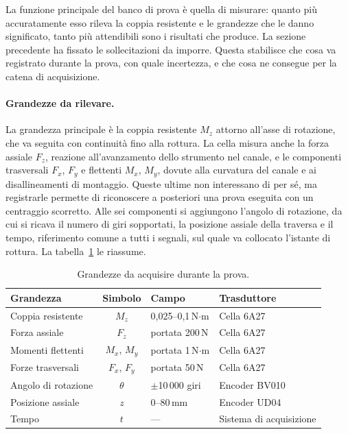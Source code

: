 La funzione principale del banco di prova è quella di misurare: quanto più
accuratamente esso rileva la coppia resistente e le grandezze che le danno
significato, tanto più attendibili sono i risultati che produce. La sezione
precedente ha fissato le sollecitazioni da imporre. Questa stabilisce che cosa va
registrato durante la prova, con quale incertezza, e che cosa ne consegue per la
catena di acquisizione.

\paragraph{Grandezze da rilevare.}
La grandezza principale è la coppia resistente $M_z$ attorno all'asse di
rotazione, che va seguita con continuità fino alla rottura. La cella misura anche
la forza assiale $F_z$, reazione all'avanzamento dello strumento nel canale, e le
componenti trasversali $F_x$, $F_y$ e flettenti $M_x$, $M_y$, dovute alla
curvatura del canale e ai disallineamenti di montaggio. Queste ultime non
interessano di per sé, ma registrarle permette di riconoscere a posteriori una
prova eseguita con un centraggio scorretto. Alle sei componenti si aggiungono
l'angolo di rotazione, da cui si ricava il numero di giri sopportati, la
posizione assiale della traversa e il tempo, riferimento comune a tutti i
segnali, sul quale va collocato l'istante di rottura. La
tabella~\ref{tab:grandezze} le riassume.

\begin{table}[!tb]
    \centering
    \caption{Grandezze da acquisire durante la prova.}
    \label{tab:grandezze}
    \footnotesize
    \setlength{\tabcolsep}{4pt}
    \begin{tabularx}{\linewidth}{@{}>{\raggedright\arraybackslash}X c l l@{}}
        \toprule
        Grandezza & Simbolo & Campo & Trasduttore \\
        \midrule
        Coppia resistente        & $M_z$          & 0,025--0,1\,N$\cdot$m & Cella 6A27 \\
        Forza assiale            & $F_z$          & portata 200\,N        & Cella 6A27 \\
        Momenti flettenti        & $M_x$, $M_y$   & portata 1\,N$\cdot$m  & Cella 6A27 \\
        Forze trasversali        & $F_x$, $F_y$   & portata 50\,N         & Cella 6A27 \\
        Angolo di rotazione      & $\theta$       & $\pm$10\,000 giri     & Encoder BV010 \\
        Posizione assiale        & $z$            & 0--80\,mm             & Encoder UD04 \\
        Tempo                    & $t$            & ---                   & Sistema di acquisizione \\
        \bottomrule
    \end{tabularx}
\end{table}

